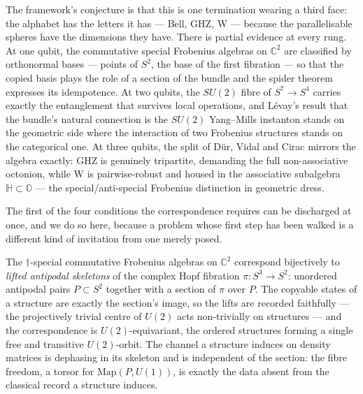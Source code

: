 The framework's conjecture is that this is one termination wearing a third face: the alphabet has
the letters it has --- Bell, GHZ, W --- because the parallelisable spheres have the dimensions they
have. There is partial evidence at every rung. At one qubit, the commutative special Frobenius
algebras on $\mathbb{C}^{2}$ are classified by orthonormal bases --- points of $S^{2}$, the base of
the first fibration --- so that the copied basis plays the role of a section of the bundle and the
spider theorem expresses its idempotence. At two qubits, the $SU(2)$ fibre of $S^{7} \to S^{4}$
carries exactly the entanglement that survives local operations, and L\'{e}vay's result that the
bundle's natural connection is the $SU(2)$ Yang--Mills instanton \autocite{levay2004geometry} stands
on the geometric side where the interaction of two Frobenius structures stands on the categorical
one. At three qubits, the split of D\"{u}r, Vidal and Cirac \autocite{durvidalcirac2000three}
mirrors the algebra exactly: GHZ is genuinely tripartite, demanding the full non-associative
octonion, while W is pairwise-robust and housed in the associative subalgebra
$\mathbb{H} \subset \mathbb{O}$ --- the special/anti-special Frobenius distinction in geometric
dress.

The first of the four conditions the correspondence requires can be discharged at once, and we do so
here, because a problem whose first step has been walked is a different kind of invitation from one
merely posed.

\begin{proposition}\label{prop:f1-dictionary}
The $\dagger$-special commutative Frobenius algebras on $\mathbb{C}^{2}$ correspond bijectively to
\emph{lifted antipodal skeletons} of the complex Hopf fibration $\pi \colon S^{3} \to S^{2}$:
unordered antipodal pairs $P \subset S^{2}$ together with a section of $\pi$ over $P$. The copyable
states of a structure are exactly the section's image, so the lifts are recorded faithfully --- the
projectively trivial centre of $U(2)$ acts non-trivially on structures --- and the correspondence is
$U(2)$-equivariant, the ordered structures forming a single free and transitive $U(2)$-orbit. The
channel a structure induces on density matrices is dephasing in its skeleton and is independent of
the section: the fibre freedom, a torsor for $\mathrm{Map}(P, U(1))$, is exactly the data absent
from the classical record a structure induces.
\end{proposition}

